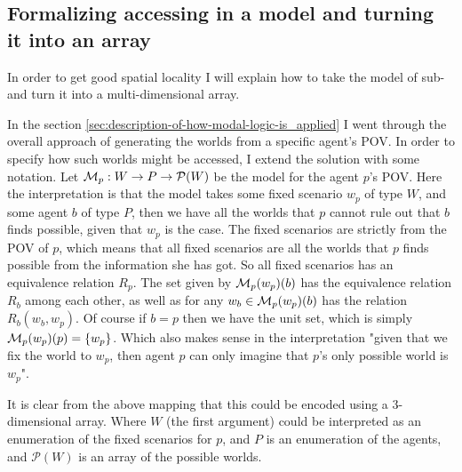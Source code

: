 \subsection{Formalizing accessing in a model and turning it into an array} \label{sec:model-access}
In order to get good spatial locality I will explain how to take the model of sub-\SfiveN{} and turn it into a multi-dimensional array.

In the section \ref{sec:description-of-how-modal-logic-is_applied} I went through the overall approach of generating the worlds from a specific agent's POV. 
In order to specify how such worlds might be accessed, I extend the solution with some notation. 
Let $\mathcal{M}_p: W \rightarrow P \rightarrow \mathcal{P}(W)$ be the model for the agent $p$'s POV. 
Here the interpretation is that the model takes some fixed scenario $w_p$ of type $W$, and some agent $b$ of type $P$, then we have all the worlds that $p$ cannot rule out that $b$ finds possible, given that $w_p$ is the case.  
The fixed scenarios are strictly from the POV of $p$, which means that all fixed scenarios are all the worlds that $p$ finds possible from the information she has got. 
So all fixed scenarios has an equivalence relation $R_p$. 
The set given by $\mathcal{M}_p(w_p)(b)$ has the equivalence relation $R_b$ among each other, as well as for any $w_b \in \mathcal{M}_p(w_p)(b)$ has the relation $R_b(w_b,w_p)$.
Of course if $b=p$ then we have the unit set, which is simply $\mathcal{M}_p(w_p)(p) = \{w_p\}$.
Which also makes sense in the interpretation "given that we fix the world to $w_p$, then agent $p$ can only imagine that $p$'s only possible world is $w_p$". 

It is clear from the above mapping that this could be encoded using a 3-dimensional array. 
Where $W$ (the first argument) could be interpreted as an enumeration of the fixed scenarios for $p$, and $P$ is an enumeration of the agents, and $\mathcal{P}(W)$ is an array of the possible worlds.


